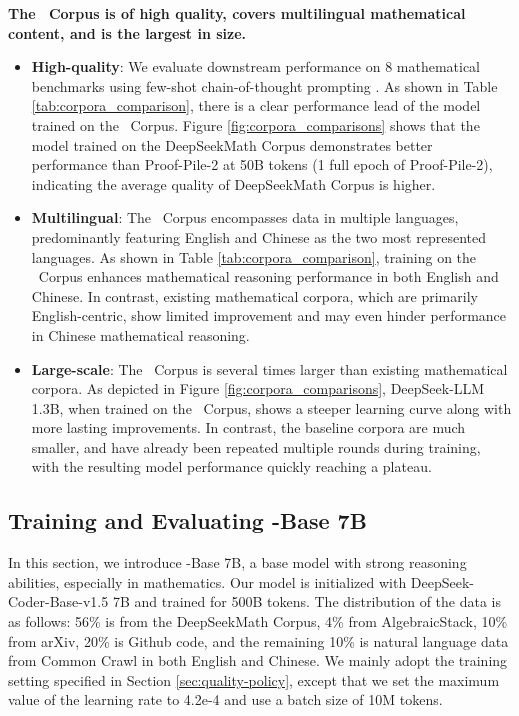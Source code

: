 \textbf{The \spmath~Corpus is of high quality, covers multilingual mathematical content, and is the largest in size.}
\begin{itemize}[topsep=0pt]
    \item \textbf{High-quality}:
    We evaluate downstream performance on 8 mathematical benchmarks using few-shot chain-of-thought prompting \cite{cot}.
    As shown in Table \ref{tab:corpora_comparison}, there is a clear performance lead of the model trained on the \spmath~Corpus. Figure \ref{fig:corpora_comparisons} shows that the model trained on the DeepSeekMath Corpus demonstrates better performance than Proof-Pile-2 at 50B tokens (1 full epoch of Proof-Pile-2), indicating the average quality of DeepSeekMath Corpus is higher. 
    \item \textbf{Multilingual}:
    The \spmath~Corpus encompasses data in multiple languages, predominantly featuring English and Chinese as the two most represented languages.
    As shown in Table \ref{tab:corpora_comparison}, training on the \spmath~Corpus enhances mathematical reasoning performance in both English and Chinese.
    In contrast, existing mathematical corpora, which are primarily English-centric, show limited improvement and may even hinder performance in Chinese mathematical reasoning.
    \item \textbf{Large-scale}:
    The \spmath~Corpus is several times larger than existing mathematical corpora.
    As depicted in Figure \ref{fig:corpora_comparisons}, DeepSeek-LLM 1.3B, when trained on the \spmath~Corpus, shows a steeper learning curve along with more lasting improvements.
    In contrast, the baseline corpora are much smaller, and have already been repeated multiple rounds during training, with the resulting model performance quickly reaching a plateau.
\end{itemize}

\subsection{Training and Evaluating \spmath-Base 7B}

In this section, we introduce \spmath-Base 7B, a base model with strong reasoning abilities, especially in mathematics.
Our model is initialized with DeepSeek-Coder-Base-v1.5 7B \citep{deepseek-coder} and trained for 500B tokens. The distribution of the data  is as follows: 56\% is from the DeepSeekMath Corpus, 4\% from AlgebraicStack, 10\% from arXiv, 20\% is Github code, and the remaining 10\% is natural language data from Common Crawl in both English and Chinese.
We mainly adopt the training setting specified in Section \ref{sec:quality-policy}, except that we set the maximum value of the learning rate to 4.2e-4 and use a batch size of 10M tokens.

